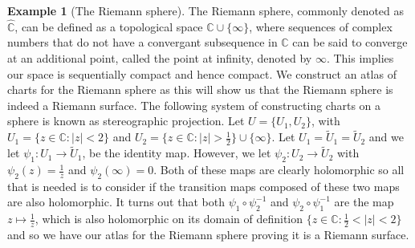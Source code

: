 \documentclass[11pt]{report}
\theoremstyle{definition}
\newtheorem*{example*}{Example}
\begin{document}
\begin{example*}[The Riemann sphere]
  The Riemann sphere, commonly denoted as $\widehat{\mathbb{C}}$, can be defined as a topological space $\mathbb{C} \cup \{\infty\}$, where sequences of complex numbers that do not have a convergant subsequence in $\mathbb{C}$ can be said to converge at an additional point, called the point at infinity, denoted by $\infty$. This implies our space is sequentially compact and hence compact. We construct an atlas of charts for the Riemann sphere as this will show us that the Riemann sphere is indeed a Riemann surface. The following system of constructing charts on a sphere is known as stereographic projection. Let $U=\{U_1,U_2\}$, with $U_1=\{z \in \mathbb{C} : |z| < 2\}$ and $U_2=\{z \in \mathbb{C} : |z| > \frac{1}{2}\}\cup \{\infty\}$. Let $U_1=\tilde{U}_1=\tilde{U}_2$ and we let $\psi_1:U_1 \rightarrow \tilde{U}_1$, be the identity map. However, we let $\psi_2:U_2 \rightarrow \tilde{U}_2$ with $\psi_2(z)=\frac{1}{z}$ and $\psi_2(\infty)=0$. Both of these maps are clearly holomorphic so all that is needed is to consider if the transition maps composed of these two maps are also holomorphic.
  It turns out that both $\psi_1 \circ \psi_2 ^{-1}$ and $\psi_2 \circ \psi_1 ^{-1}$ are the map $z \mapsto \frac{1}{z}$, which is also holomorphic on its domain of definition $\{z\in \mathbb{C} : \frac{1}{2} < |z| < 2\}$ and so we have our atlas for the Riemann sphere proving it is a Riemann surface.
\end{example*}
\end{document}
